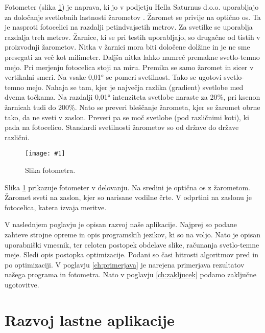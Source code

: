 \documentclass[oneside, a4paper, 12pt]{book}
\newcommand{\slika}[3]{
	\begin{figure}
	\begin{center}
	\texttt{[image: \#1]}
	\end{center}
	\vspace{-20pt}
	\caption{#2}
	\label{#3}
	\end{figure}
}
\begin{document}
Fotometer (slika \ref{pic:fotometer}) je naprava, ki jo v podjetju Hella Saturnus d.o.o. uporabljajo za določanje svetlobnih lastnosti žarometov \cite{hella-fotometer}. Žaromet se privije na optično os. Ta je nasproti fotocelici na razdalji petindvajsetih metrov. Za svetilke se uporablja razdalja treh metrov. Žarnice, ki se pri testih uporabljajo, so drugačne od tistih v proizvodnji žarometov. Nitka v žarnici mora biti določene dolžine in je ne sme presegati za več kot milimeter. Daljša nitka lahko namreč premakne svetlo-temno mejo. Pri merjenju fotocelica stoji na miru. Premika se samo žaromet in sicer v vertikalni smeri. Na vsake 0,01° se pomeri svetilnost. Tako se ugotovi svetlo-temno mejo. Nahaja se tam, kjer je največja razlika (gradient) svetlobe med dvema točkama. Na razdalji 0,01° intenziteta svetlobe naraste za 20\%, pri ksenon žarnicah tudi do 200\%. Nato se preveri bleščanje žarometa, kjer se žaromet obrne tako, da ne sveti v zaslon. Preveri pa se moč svetlobe (pod različnimi koti), ki pada na fotocelico. Standardi svetilnosti žarometov so od države do države različni. 

\slika{slike/Photometer.jpg}{Slika fotometra.}{pic:fotometer}
Slika \ref{pic:fotometer} prikazuje fotometer v delovanju. Na sredini je optična os z žarometom. Žaromet sveti na zaslon, kjer so narisane vodilne črte. V odprtini na zaslonu je fotocelica, katera izvaja meritve.

V naslednjem poglavju je opisan razvoj naše aplikacije. Najprej so podane zahteve strojne opreme in opis programskih jezikov, ki so na voljo. Nato je opisan uporabniški vmesnik, ter celoten postopek obdelave slike, računanja svetlo-temne meje. Sledi opis postopka optimizacije. Podani so časi hitrosti algoritmov pred in po optimizaciji. V poglavju \ref{ch:primerjava} je narejena primerjava rezultatov našega programa in fotometra. Nato v poglavju \ref{ch:zakljucek} podamo zaključne ugotovitve.

\chapter{Razvoj lastne aplikacije}
\end{document}
